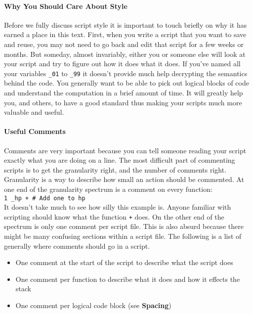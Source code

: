 \paragraph*{Why You Should Care About Style\\}
\hspace*{\parindent}%
Before we fully discuss script style it is important to touch briefly on why it
has earned a place in this text. First, when you write a script that you want
to save and reuse, you may not need to go back and edit that script for a few
weeks or months. But someday, almost invariably, either you or someone else will
look at your script and try to figure out how it does what it does. If you've
named all your variables \texttt{\_01} to \texttt{\_99} it doesn't provide much
help decrypting the semantics behind the code. You generally want to be able
to pick out logical blocks of code and understand the computation in a brief
amount of time. It will greatly help you, and others, to have a good standard
thus making your scripts much more valuable and useful.

\paragraph*{Useful Comments\\}
\hspace*{\parindent}%
Comments are very important because you can tell someone reading your script
exactly what you are doing on a line. The most difficult part of commenting
scripts is to get the granularity right, and the number of comments right.
Granularity is a way to describe how small an action should be commented. At
one end of the granularity spectrum is a comment on every function:\\
\indent\texttt{1 \_hp + \# Add one to hp}\\
It doesn't take much to see how silly this example is. Anyone familiar with
\progLogo scripting should know what the function \texttt{+} does. On the other
end of the spectrum is only one comment per script file. This is also absurd
because there might be many confusing sections within a script file. The
following is a list of generally where comments should go in a script.

\begin{itemize}
    \item One comment at the start of the script to describe what the script does
    \item One comment per function to describe what it does and how it effects the stack
    \item One comment per logical code block (see \textbf{Spacing})
\end{itemize}

